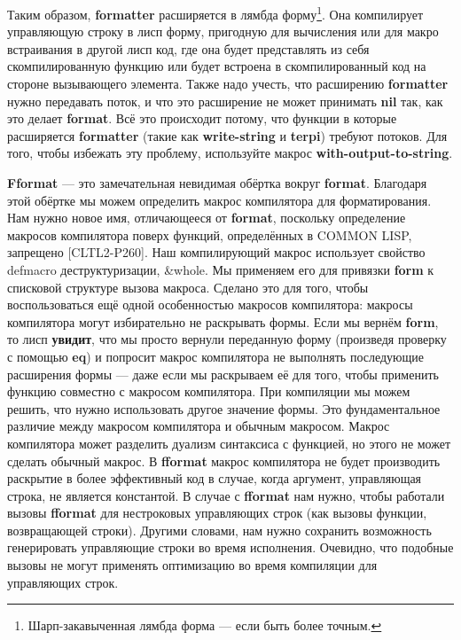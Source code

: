 Таким образом, \textbf{formatter} расширяется в лямбда форму\footnote{Шарп-закавыченная лямбда форма --- если быть более точным.}. Она компилирует управляющую строку в лисп форму, пригодную для вычисления или для макро встраивания в другой лисп код, где она будет представлять из себя скомпилированную функцию или будет встроена в скомпилированный код на стороне вызывающего элемента. Также надо учесть, что расширению \textbf{formatter} нужно передавать поток, и что это расширение не может принимать \textbf{nil} так, как это делает \textbf{format}. Всё это происходит потому, что функции в которые расширяется \textbf{formatter} (такие как \textbf{write-string} и \textbf{terpi}) требуют потоков. Для того, чтобы избежать эту проблему, используйте макрос \textbf{with-output-to-string}.


\textbf{Fformat} --- это замечательная невидимая обёртка вокруг \textbf{format}. Благодаря этой обёртке мы можем определить макрос компилятора для форматирования. Нам нужно новое имя, отличающееся от \textbf{format}, поскольку определение макросов компилятора поверх функций, определённых в COMMON LISP, запрещено [CLTL2-P260]. Наш компилирующий макрос использует свойство defmacro деструктуризации, \&whole. Мы применяем его для привязки \textbf{form} к списковой структуре вызова макроса. Сделано это для того, чтобы воспользоваться ещё одной особенностью макросов компилятора: макросы компилятора могут избирательно не раскрывать формы. Если мы вернём \textbf{form}, то лисп \textbf{увидит}, что мы просто вернули переданную форму (произведя проверку с помощью \textbf{eq}) и попросит макрос компилятора не выполнять последующие расширения формы --- даже если мы раскрываем её для того, чтобы применить функцию совместно с макросом компилятора. При компиляции мы можем решить, что нужно использовать другое значение формы. Это фундаментальное различие между макросом компилятора и обычным макросом. Макрос компилятора может разделить дуализм синтаксиса с функцией, но этого не может сделать обычный макрос. В \textbf{fformat} макрос компилятора не будет производить раскрытие в более эффективный код в случае, когда аргумент, управляющая строка, не является константой. В случае с \textbf{fformat} нам нужно, чтобы работали вызовы \textbf{fformat} для нестроковых управляющих строк (как вызовы функции, возвращающей строки). Другими словами, нам нужно сохранить возможность генерировать управляющие строки во время исполнения. Очевидно, что подобные вызовы не могут применять оптимизацию во время компиляции для управляющих строк.

